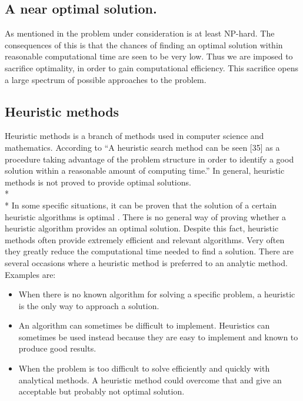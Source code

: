 \subsection{A near optimal solution.}
As mentioned in \cite{paper1} the problem under consideration is at least NP-hard. The consequences of this is that the chances of finding an optimal solution within reasonable computational time are seen to be very low. Thus we are imposed to sacrifice optimality, in order to gain computational efficiency. This sacrifice opens a large spectrum of possible approaches to the problem.
\subsection{Heuristic methods}
Heuristic methods is a branch of methods used in computer science and mathematics. According to \cite{heuristics} ``A heuristic search method can be seen [35] as a procedure taking advantage of the problem structure in order to identify a good solution within a reasonable amount of computing time.''
In general, heuristic methods is not proved to provide optimal solutions.\\*%
\\*
In some specific situations, it can be proven that the solution of a certain heuristic algorithms is optimal%
. There is no general way of proving whether a heuristic algorithm provides an optimal solution. Despite this fact, heuristic methods often provide extremely efficient and relevant algorithms. Very often they greatly reduce the computational time needed to find a solution. There are several occasions where a heuristic method is preferred to an analytic method. Examples are:
\begin{itemize}
\item When there is no known algorithm for solving a specific problem, a heuristic is the only way to approach a solution.
\item An algorithm can sometimes be difficult to implement. Heuristics can sometimes be used instead because they are easy to implement and known to produce good results.
\item When the problem is too difficult to solve efficiently and quickly with analytical methods. A heuristic method could overcome that and give an acceptable but probably not optimal solution.
\end{itemize}

